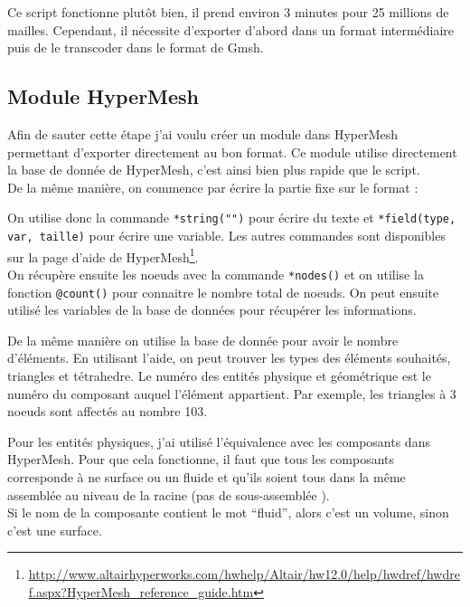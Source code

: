 Ce script fonctionne plutôt bien, il prend environ 3 minutes pour 25 millions de mailles. Cependant, il nécessite d'exporter d'abord dans un format intermédiaire puis de le transcoder dans le format de Gmsh. 

\subsection{Module HyperMesh} 

Afin de sauter cette étape j'ai voulu créer un module dans HyperMesh permettant d'exporter directement au bon format. Ce module utilise directement la base de donnée de HyperMesh, c'est ainsi bien plus rapide que le script.\\
De la même manière, on commence par écrire la partie fixe sur le format :


On utilise donc la commande \texttt{*string("")} pour écrire du texte et \texttt{*field(type, var, taille)} pour écrire une variable. Les autres commandes sont disponibles sur la page d'aide de HyperMesh\footnote{\url{http://www.altairhyperworks.com/hwhelp/Altair/hw12.0/help/hwdref/hwdref.aspx?HyperMesh\_reference\_guide.htm}}.\\
On récupère ensuite les noeuds avec la commande \texttt{*nodes()} et on utilise la fonction \texttt{@count()} pour connaitre le nombre total de noeuds. On peut ensuite utilisé les variables de la base de données pour récupérer les informations.


De la même manière on utilise la base de donnée pour avoir le nombre d'éléments. En utilisant l'aide, on peut trouver les types des éléments souhaités, triangles et tétrahedre. Le numéro des entités physique et géométrique est le numéro du composant auquel l'élément appartient. Par exemple, les triangles à 3 noeuds sont affectés au nombre 103.


Pour les entités physiques, j'ai utilisé l'équivalence avec les composants dans HyperMesh. Pour que cela fonctionne, il faut que tous les composants corresponde à ne surface ou un fluide et qu'ils soient tous dans la même assemblée au niveau de la racine (pas de sous-assemblée ).\\
Si le nom de la composante contient le mot ``fluid'', alors c'est un volume, sinon c'est une surface.



